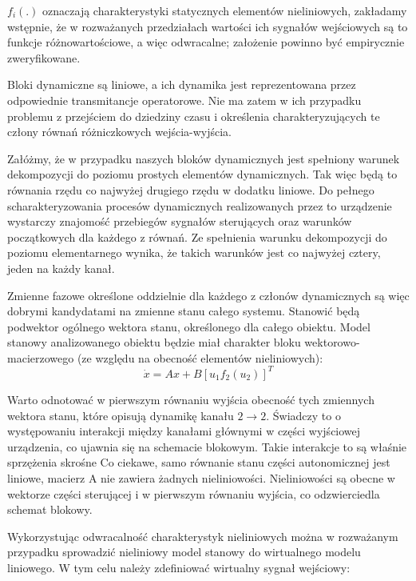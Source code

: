 \documentclass{article}
\begin{document}
		$ f_i(.) $ oznaczają charakterystyki statycznych elementów nieliniowych, zakładamy wstępnie,
		że w rozważanych przedziałach wartości ich sygnałów wejściowych są to funkcje
		różnowartościowe, a więc odwracalne; założenie powinno być empirycznie zweryfikowane.

		Bloki dynamiczne są liniowe, a ich dynamika jest reprezentowana przez odpowiednie
		transmitancje operatorowe. Nie ma zatem w ich przypadku problemu z przejściem do
		dziedziny czasu i określenia charakteryzujących te człony równań różniczkowych 
		wejścia-wyjścia.

		Załóżmy, że w przypadku naszych bloków dynamicznych jest spełniony warunek dekompozycji 
		do poziomu prostych elementów dynamicznych. Tak więc będą to równania rzędu co najwyżej
		drugiego rzędu w dodatku liniowe. Do pełnego scharakteryzowania procesów dynamicznych
		realizowanych przez to urządzenie wystarczy znajomość przebiegów sygnałów sterujących
		oraz warunków początkowych dla każdego z równań. Ze spełnienia warunku
		dekompozycji do poziomu elementarnego wynika, że takich warunków jest co najwyżej
		cztery, jeden na każdy kanał.

		Zmienne fazowe określone oddzielnie dla każdego z członów dynamicznych są więc dobrymi
		kandydatami na zmienne stanu całego systemu. Stanowić będą podwektor ogólnego wektora
		stanu, określonego dla całego obiektu. Model stanowy analizowanego obiektu będzie miał
		charakter bloku wektorowo-macierzowego (ze względu na obecność elementów
		nieliniowych):
		\begin{equation}
			\dot{x} = Ax+B[u_1 f_2(u_2)]^T
		\end{equation}

		Warto odnotować w pierwszym równaniu wyjścia obecność tych zmiennych wektora stanu,
		które opisują dynamikę kanału $2 \rightarrow 2$. Świadczy to o występowaniu interakcji między
		kanałami głównymi w części wyjściowej urządzenia, co
		ujawnia się na schemacie blokowym. Takie interakcje to są właśnie sprzężenia skrośne
		Co ciekawe, samo równanie stanu części autonomicznej jest liniowe, macierz A nie zawiera żadnych
		nieliniowości. Nieliniowości są obecne w wektorze
		części sterującej i w pierwszym równaniu wyjścia, co odzwierciedla schemat blokowy.

		Wykorzystując odwracalność charakterystyk nieliniowych można w rozważanym przypadku
		sprowadzić nieliniowy model stanowy do wirtualnego modelu liniowego. W tym celu należy
		zdefiniować wirtualny sygnał wejściowy:
\end{document}

